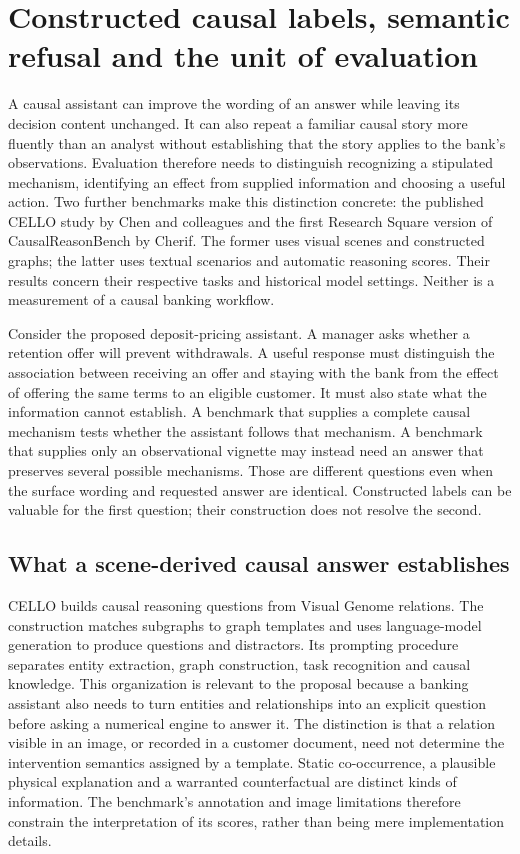 \section{Constructed causal labels, semantic refusal and the unit of evaluation}
\label{exec17:benchmark-development}

A causal assistant can improve the wording of an answer while leaving its
decision content unchanged. It can also repeat a familiar causal story more
fluently than an analyst without establishing that the story applies to the
bank's observations. Evaluation therefore needs to distinguish recognizing a
stipulated mechanism, identifying an effect from supplied information and
choosing a useful action. Two further benchmarks make this distinction
concrete: the published CELLO study by Chen and colleagues and the first
Research Square version of CausalReasonBench by Cherif. The former uses visual
scenes and constructed graphs; the latter uses textual scenarios and automatic
reasoning scores. Their results concern their respective tasks and historical
model settings. Neither is a measurement of a causal banking
workflow.~\citep{exec17_benchmark_cello,exec17_benchmark_cherif}

Consider the proposed deposit-pricing assistant. A manager asks whether a
retention offer will prevent withdrawals. A useful response must distinguish
the association between receiving an offer and staying with the bank from the
effect of offering the same terms to an eligible customer. It must also state
what the information cannot establish. A benchmark that supplies a complete
causal mechanism tests whether the assistant follows that mechanism. A
benchmark that supplies only an observational vignette may instead need an
answer that preserves several possible mechanisms. Those are different
questions even when the surface wording and requested answer are identical.
Constructed labels can be valuable for the first question; their construction
does not resolve the second.

\subsection{What a scene-derived causal answer establishes}

CELLO builds causal reasoning questions from Visual Genome relations. The
construction matches subgraphs to graph templates and uses language-model
generation to produce questions and distractors. Its prompting procedure
separates entity extraction, graph construction, task recognition and causal
knowledge. This organization is relevant to the proposal because a banking
assistant also needs to turn entities and relationships into an explicit
question before asking a numerical engine to answer it. The distinction is
that a relation visible in an image, or recorded in a customer document, need
not determine the intervention semantics assigned by a template. Static
co-occurrence, a plausible physical explanation and a warranted counterfactual
are distinct kinds of information. The benchmark's annotation and image
limitations therefore constrain the interpretation of its scores, rather than
being mere implementation details.~\citep{exec17_benchmark_cello}

